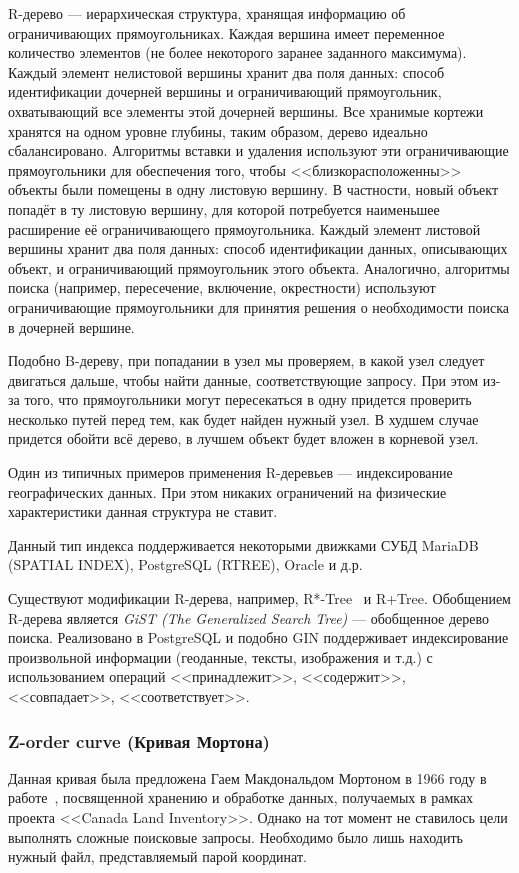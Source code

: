 R-дерево --- иерархическая структура, хранящая информацию об ограничивающих прямоугольниках.
Каждая вершина имеет переменное количество элементов (не более некоторого заранее заданного максимума).
Каждый элемент нелистовой вершины хранит два поля данных: способ идентификации дочерней вершины и ограничивающий прямоугольник, охватывающий все элементы этой дочерней вершины.
Все хранимые кортежи хранятся на одном уровне глубины, таким образом, дерево идеально сбалансировано.
Алгоритмы вставки и удаления используют эти ограничивающие прямоугольники для обеспечения того,
чтобы <<близкорасположенны>> объекты были помещены в одну листовую вершину.
В частности, новый объект попадёт в ту листовую вершину, для которой потребуется наименьшее расширение её ограничивающего прямоугольника.
Каждый элемент листовой вершины хранит два поля данных: способ идентификации данных, описывающих объект, и ограничивающий прямоугольник этого объекта.
Аналогично, алгоритмы поиска (например, пересечение, включение, окрестности) используют ограничивающие прямоугольники для принятия решения о необходимости поиска в дочерней вершине.

Подобно B-дереву, при попадании в узел мы проверяем, в какой узел следует двигаться дальше,
чтобы найти данные, соответствующие запросу.
При этом из-за того, что прямоугольники могут пересекаться в одну придется проверить несколько путей
перед тем, как будет найден нужный узел.
В худшем случае придется обойти всё дерево, в лучшем объект будет вложен в корневой узел.

Один из типичных примеров применения R-деревьев --- индексирование географических данных.
При этом никаких ограничений на физические характеристики данная структура не ставит.

Данный тип индекса поддерживается некоторыми движками СУБД MariaDB (SPATIAL INDEX), PostgreSQL (RTREE), Oracle и д.р.


Существуют модификации R-дерева, например, R*-Tree~\cite{beckmann1990rstree} и R+Tree.
Обобщением R-дерева является \textit{GiST (The Generalized Search Tree)} --- обобщенное дерево поиска.
Реализовано в PostgreSQL и подобно GIN поддерживает индексирование произвольной информации (геоданные, тексты, изображения и т.д.) с использованием операций <<принадлежит>>, <<содержит>>, <<совпадает>>, <<соответствует>>.

\subsubsection{Z-order curve (Кривая Мортона)}
Данная кривая была предложена Гаем Макдональдом Мортоном в 1966 году
в работе~\cite{morton1966computer}, посвященной хранению и обработке данных,
получаемых в рамках проекта <<Canada Land Inventory>>.
Однако на тот момент не ставилось цели выполнять сложные поисковые запросы.
Необходимо было лишь находить нужный файл, представляемый парой координат.

